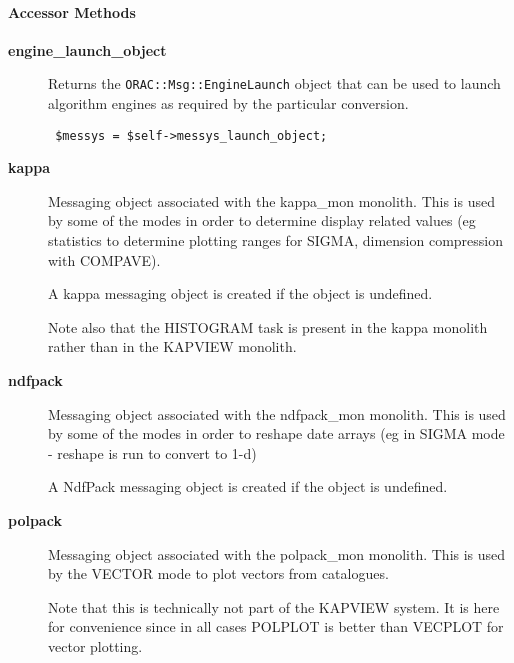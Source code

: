 \paragraph*{Accessor Methods\label{ORAC::Display::KAPVIEW_Accessor_Methods}}
\begin{description}

\item[\textbf{engine\_launch\_object}] \mbox{}

Returns the \texttt{ORAC::Msg::EngineLaunch} object that can be used
to launch algorithm engines as required by the particular
conversion.

\begin{verbatim}
 $messys = $self->messys_launch_object;
\end{verbatim}

\item[\textbf{kappa}] \mbox{}

Messaging object associated with the kappa\_mon monolith.
This is used by some of the modes in order to determine
display related values (eg statistics to determine plotting
ranges for SIGMA, dimension compression with COMPAVE).



A kappa messaging object is created if the object is undefined.



Note also that the HISTOGRAM task is present in the kappa monolith
rather than in the KAPVIEW monolith.


\item[\textbf{ndfpack}] \mbox{}

Messaging object associated with the ndfpack\_mon monolith.
This is used by some of the modes in order to reshape
date arrays (eg in SIGMA mode - reshape is run to convert
to 1-d)



A NdfPack messaging object is created if the object is undefined.


\item[\textbf{polpack}] \mbox{}

Messaging object associated with the polpack\_mon monolith.
This is used by the VECTOR mode to plot vectors from catalogues.



Note that this is technically not part of the KAPVIEW system.
It is here for convenience since in all cases POLPLOT is better
than VECPLOT for vector plotting.




\end{description}
